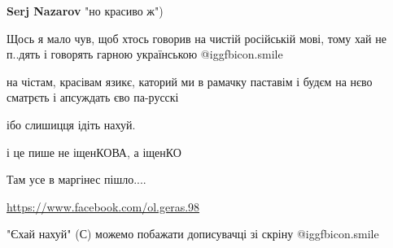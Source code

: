 \begin{itemize}
\begin{itemize}
\textbf{Serj Nazarov} "но красиво ж")
\end{itemize}

 
Щось я мало чув, щоб хтось говорив на чистій російській мові, тому хай не п..дять і говорять гарною українською  @igg{fbicon.smile} 

 
на чістам, красівам язикє, каторий ми в рамачку паставім і будєм на нєво сматрєть і апсуждать єво па-русскі

 
ібо слишицця ідіть нахуй.

 
і це пише не іщенКОВА, а іщенКО

 
Там усе в маргінес пішло....

\url{https://www.facebook.com/ol.geras.98}\par
 
"Єхай нахуй" (С) можемо побажати дописувачці зі скріну  @igg{fbicon.smile} 


\end{itemize}
